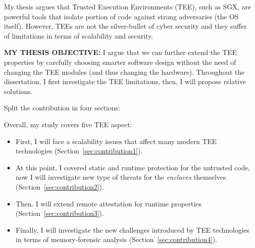 
My thesis argues that Trusted Execution Environments (TEE), such as SGX, are 
powerful tools that isolate portion of code against strong adversaries (\ie the 
OS itself).
However, TEEs are not the silver-bullet of cyber security and they suffer of 
limitations in terms of scalability and security.

\textbf{MY THESIS OBJECTIVE:}
I argue that we can further extend the TEE properties by carefully choosing 
smarter software design without the need of changing the TEE modules (and thus 
changing the hardware).
Throughout the dissertation, I first investigate the TEE limitations, 
then, I will propose relative solutions.


Split the contribution in four sections:

Overall, my study covers five TEE aspect:
\begin{itemize}
	\item {} First, I will face a 
	scalability issues that affect many modern	TEE technologies 
	(Section~\ref{sec:contribution1}).
	
	\item {} At this point, I covered static and runtime 
	protection for the untrusted code, now I will investigate new type of 
	threats for the \emph{enclaves} themselves 	
	(Section~\ref{sec:contribution2}).
	
	\item {} Then. I will extend remote attestation for 
	runtime properties (Section~\ref{sec:contribution3}).
	
	\item {} Finally, I will investigate the new 
	challenges introduced by TEE technologies in terms of memory-forensic 
	analysis (Section~\ref{sec:contribution4}).
\end{itemize}

